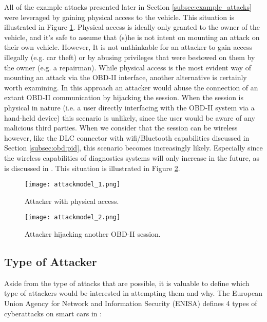 All of the example attacks presented later in Section \ref{subsec:example_attacks} were leveraged by gaining physical access to the vehicle. This situation is illustrated in Figure \ref{fig:attackmodel_1}. Physical access is ideally only granted to the owner of the vehicle, and it's safe to assume that (s)he is not intent on mounting an attack on their own vehicle. However, It is not unthinkable for an attacker to gain access illegally (e.g. car theft) or by abusing privileges that were bestowed on them by the owner (e.g. a repairman). While physical access is the most evident way of mounting an attack via the OBD-II interface, another alternative is certainly worth examining. In this approach an attacker would abuse the connection of an extant OBD-II communication by hijacking the session. When the session is physical in nature (i.e. a user directly interfacing with the OBD-II system via a hand-held device) this scenario is unlikely, since the user would be aware of any malicious third parties. When we consider that the session can be wireless however, like the DLC connector with wifi/Bluetooth capabilities discussed in Section \ref{subsec:obd:pid}, this scenario becomes increasingly likely. Especially since the wireless capabilities of diagnostics systems will only increase in the future, as is discussed in \cite{Kleberger}. This situation is illustrated in Figure \ref{fig:attackmodel_2}.


\begin{figure}[h]
	\centering
	\texttt{[image: attackmodel\_1.png]}
	\caption{Attacker with physical access.}
	\label{fig:attackmodel_1}
\end{figure}

\begin{figure}[h]
	\centering
	\texttt{[image: attackmodel\_2.png]}
	\caption{Attacker hijacking another OBD-II session.}
	\label{fig:attackmodel_2}
\end{figure}

\subsection{Type of Attacker}
\label{subsec:attacker_type}

Aside from the type of attacks that are possible, it is valuable to define which type of attackers would be interested in attempting them and why. The European Union Agency for Network and Information Security (ENISA) defines 4 types of cyberattacks on smart cars in \cite{Enisa}: 

